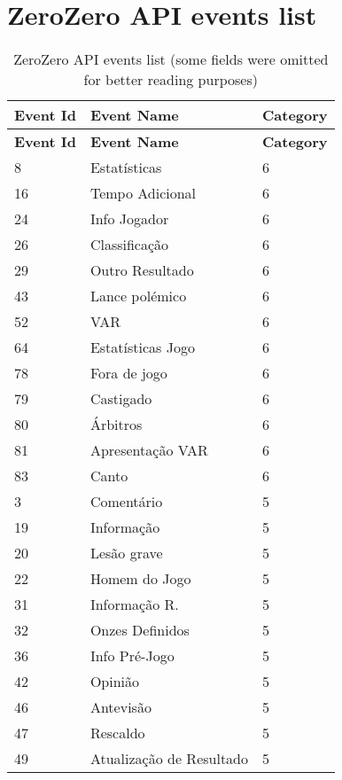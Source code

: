 \chapter{ZeroZero API events list} \label{annex:api-events}

\begin{longtable}{| p{} | p{} | p{} |} 
    \caption{ZeroZero API events list (some fields were omitted for better reading purposes)} \\
    \hline
    \textbf{Event Id} & \textbf{Event Name} & \textbf{Category} \\ \hline
    \endfirsthead       
    \hline    
    \textbf{Event Id} & \textbf{Event Name} & \textbf{Category} \\ \hline       
    \endhead      
    8 & Estatísticas & 6 \\ \hline
    16 & Tempo Adicional & 6 \\ \hline
    24 & Info Jogador & 6 \\ \hline
    26 & Classificação & 6 \\ \hline
    29 & Outro Resultado & 6 \\ \hline
    43 & Lance polémico & 6 \\ \hline
    52 & VAR & 6 \\ \hline
    64 & Estatísticas Jogo & 6 \\ \hline
    78 & Fora de jogo & 6 \\ \hline
    79 & Castigado & 6 \\ \hline
    80 & Árbitros & 6 \\ \hline
    81 & Apresentação VAR & 6 \\ \hline
    83 & Canto & 6 \\ \hline
    3 & Comentário & 5 \\ \hline
    19 & Informação & 5 \\ \hline
    20 & Lesão grave & 5 \\ \hline
    22 & Homem do Jogo & 5 \\ \hline
    31 & Informação R. & 5 \\ \hline
    32 & Onzes Definidos & 5 \\ \hline
    36 & Info Pré-Jogo & 5 \\ \hline
    42 & Opinião & 5 \\ \hline
    46 & Antevisão & 5 \\ \hline
    47 & Rescaldo & 5 \\ \hline
    49 & Atualização de Resultado & 5 \\ \hline

\end{longtable}

